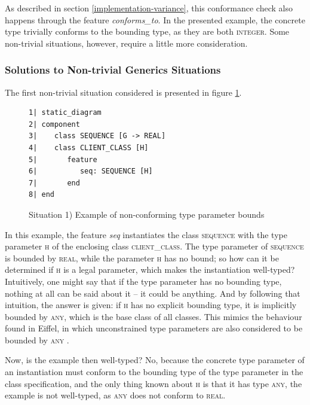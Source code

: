 As described in section \ref{implementation-variance}, this conformance check also happens through the feature \textit{conforms\_to}. In the presented example, the concrete type trivially conforms to the bounding type, as they are both \textsc{integer}. Some non-trivial situations, however, require a little more consideration.
\subsubsection{Solutions to Non-trivial Generics Situations}
The first non-trivial situation considered is presented in figure \ref{fig:non_conforming_type_bounds}.
\begin{figure}[H]
{\footnotesize
\begin{verbatim}
1| static_diagram
2| component
3|    class SEQUENCE [G -> REAL]
4|    class CLIENT_CLASS [H]
5|       feature
6|          seq: SEQUENCE [H]
7|       end
8| end
\end{verbatim}
}
\caption{Situation 1) Example of non-conforming type parameter bounds}
\label{fig:non_conforming_type_bounds}
\end{figure}
In this example, the feature \textit{seq} instantiates the class \textsc{sequence} with the type parameter \textsc{h} of the enclosing class \textsc{client\_class}. The type parameter of \textsc{sequence} is bounded by \textsc{real}, while the parameter \textsc{h} has no bound; so how can it be determined if \textsc{h} is a legal parameter, which makes the instantiation well-typed? Intuitively, one might say that if the type parameter has no bounding type, nothing at all can be said about it -- it could be anything. And by following that intuition, the answer is given: if \textsc{h} has no explicit bounding type, it is implicitly bounded by \textsc{any}, which is the base class of all classes. This mimics the behaviour found in Eiffel, in which unconstrained type parameters are also considered to be bounded by \textsc{any} \cite[p.~77]{meyer2001}.

Now, is the example then well-typed? No, because the concrete type parameter of an instantiation must conform to the bounding type of the type parameter in the class specification, and the only thing known about \textsc{h} is that it has type \textsc{any}, the example is not well-typed, as \textsc{any} does not conform to \textsc{real}.
